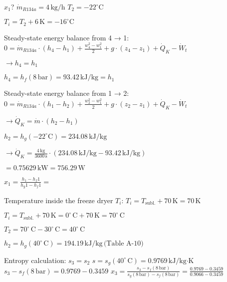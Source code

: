 \( x_1 \)?  
\( \dot{m}_{R134a} = 4 \, \text{kg/h} \)  
\( T_2 = -22^\circ \text{C} \)  

\( T_i = T_2 + 6 \, \text{K} = -16^\circ \text{C} \)  

Steady-state energy balance from 4 → 1:  
\( 0 = \dot{m}_{R134a} \cdot (h_4 - h_1) + \frac{w_4^2 - w_1^2}{2} + g \cdot (z_4 - z_1) + \dot{Q}_K - \dot{W}_t \)  

\( \rightarrow h_4 = h_1 \)  

\( h_4 = h_f (8 \, \text{bar}) = 93.42 \, \text{kJ/kg} = h_1 \)  

Steady-state energy balance from 1 → 2:  
\( 0 = \dot{m}_{R134a} \cdot (h_1 - h_2) + \frac{w_2^2 - w_1^2}{2} + g \cdot (z_2 - z_1) + \dot{Q}_K - \dot{W}_t \)  

\( \rightarrow \dot{Q}_K = \dot{m} \cdot (h_2 - h_1) \)  

\( h_2 = h_g (-22^\circ \text{C}) = 234.08 \, \text{kJ/kg} \)  

\( \rightarrow \dot{Q}_K = \frac{4 \, \text{kg}}{3600 \, \text{s}} \cdot (234.08 \, \text{kJ/kg} - 93.42 \, \text{kJ/kg}) \)  

\( = 0.75629 \, \text{kW} = 756.29 \, \text{W} \)  

\( x_1 = \frac{h_1 - h_f1}{h_g1 - h_f1} = \)

Temperature inside the freeze dryer \( T_i \):  
\( T_i = T_{\text{subl.}} + 70 \, \text{K} = 70 \, \text{K} \)  

\( T_i = T_{\text{subl.}} + 70 \, \text{K} = 0^\circ \, \text{C} + 70 \, \text{K} = 70^\circ \, \text{C} \)  

\( T_2 = 70^\circ \, \text{C} - 30^\circ \, \text{C} = 40^\circ \, \text{C} \)  

\( h_2 = h_g (40^\circ \, \text{C}) = 194.19 \, \text{kJ/kg} \, \text{(Table A-10)} \)  

Entropy calculation:  
\( s_3 = s_2 \)  
\( s = s_g (40^\circ \, \text{C}) = 0.9769 \, \text{kJ/kg·K} \)  
\( s_3 - s_f (8 \, \text{bar}) = 0.9769 - 0.3459 \)  
\( x_3 = \frac{s_3 - s_f (8 \, \text{bar})}{s_g (8 \, \text{bar}) - s_f (8 \, \text{bar})} = \frac{0.9769 - 0.3459}{0.9066 - 0.3459} \)